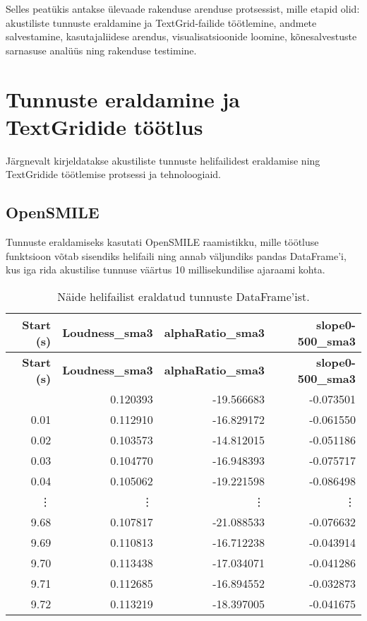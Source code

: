 Selles peatükis antakse ülevaade rakenduse arenduse protsessist, mille etapid olid: akustiliste tunnuste eraldamine ja TextGrid-failide töötlemine, andmete salvestamine, kasutajaliidese arendus, visualisatsioonide loomine, kõnesalvestuste sarnasuse analüüs ning rakenduse testimine.

\section{Tunnuste eraldamine ja TextGridide töötlus}
Järgnevalt kirjeldatakse akustiliste tunnuste helifailidest eraldamise ning TextGridide töötlemise protsessi ja tehnoloogiaid.

\subsection{OpenSMILE}
Tunnuste eraldamiseks kasutati OpenSMILE \cite{opensmile} raamistikku, mille töötluse funktsioon võtab sisendiks helifaili ning annab väljundiks pandas DataFrame'i, kus iga rida akustilise tunnuse väärtus 10 millisekundilise ajaraami kohta.

\begin{longtable}{|r|r|r|r|}
    \caption{Näide helifailist eraldatud tunnuste DataFrame'ist.} \label{table:example} \\
    \hline
    \textbf{Start (s)} & \textbf{Loudness\_sma3} & \textbf{alphaRatio\_sma3} & \textbf{slope0-500\_sma3} \\
    \hline
    \endfirsthead
    \hline
    \textbf{Start (s)} & \textbf{Loudness\_sma3} & \textbf{alphaRatio\_sma3} & \textbf{slope0-500\_sma3} \\
    \hline
    \endhead
    \hline
    \endfoot
    \hline
    \endlastfoot
    0.00 & 0.120393 & -19.566683 & -0.073501 \\
    0.01 & 0.112910 & -16.829172 & -0.061550 \\
    0.02 & 0.103573 & -14.812015 & -0.051186 \\
    0.03 & 0.104770 & -16.948393 & -0.075717 \\
    0.04 & 0.105062 & -19.221598 & -0.086498 \\
    {\vdots} & {\vdots} & {\vdots} & {\vdots} \\
    9.68 & 0.107817 & -21.088533 & -0.076632 \\
    9.69 & 0.110813 & -16.712238 & -0.043914 \\
    9.70 & 0.113438 & -17.034071 & -0.041286 \\
    9.71 & 0.112685 & -16.894552 & -0.032873 \\
    9.72 & 0.113219 & -18.397005 & -0.041675 \\
\end{longtable}

